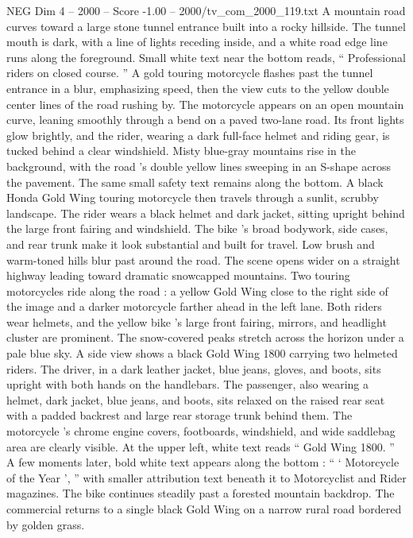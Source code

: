 \begin{textsample}{NEG Dim 4 – 2000 – Score -1.00 – 2000/tv\_com\_2000\_119.txt}  \label{ex:f4_neg_046}
A mountain road curves toward a large stone tunnel entrance built into a rocky hillside.
The tunnel mouth is dark, with a line of lights receding inside, and a white road edge line runs along the foreground.
Small white text near the bottom reads, “ Professional riders on closed course. ” A gold touring motorcycle flashes past the tunnel entrance in a blur, emphasizing speed, then the view cuts to the yellow double center lines of the road rushing by.
The motorcycle appears on an open mountain curve, leaning smoothly through a bend on a paved two-lane road.
Its front lights glow brightly, and the rider, wearing a dark full-face helmet and riding gear, is tucked behind a clear windshield.
Misty blue-gray mountains rise in the background, with the road ’s double yellow lines sweeping in an S-shape across the pavement.
The same small safety text remains along the bottom.
A black Honda Gold Wing touring motorcycle then travels through a sunlit, scrubby landscape.
The rider wears a black helmet and dark jacket, sitting upright behind the large front fairing and windshield.
The bike ’s broad bodywork, side cases, and rear trunk make it look substantial and built for travel.
Low brush and warm-toned hills blur past around the road.
The scene opens wider on a straight highway leading toward dramatic snowcapped mountains.
Two touring motorcycles ride along the road : a yellow Gold Wing close to the right side of the image and a darker motorcycle farther ahead in the left lane.
Both riders wear helmets, and the yellow bike ’s large front fairing, mirrors, and headlight cluster are prominent.
The snow-covered peaks stretch across the horizon under a pale blue sky.
A side view shows a black Gold Wing 1800 carrying two helmeted riders.
The driver, in a dark leather jacket, blue jeans, gloves, and boots, sits upright with both hands on the handlebars.
The passenger, also wearing a helmet, dark jacket, blue jeans, and boots, sits relaxed on the raised rear seat with a padded backrest and large rear storage trunk behind them.
The motorcycle ’s chrome engine covers, footboards, windshield, and wide saddlebag area are clearly visible.
At the upper left, white text reads “ Gold Wing 1800. ” A few moments later, bold white text appears along the bottom : “ ‘ Motorcycle of the Year ’, ” with smaller attribution text beneath it to Motorcyclist and Rider magazines.
The bike continues steadily past a forested mountain backdrop.
The commercial returns to a single black Gold Wing on a narrow rural road bordered by golden grass.

\end{textsample}

